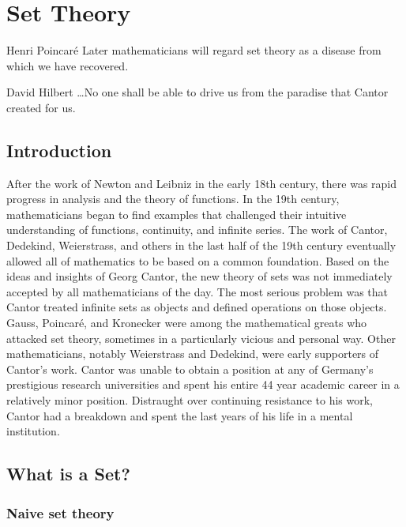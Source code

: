 \chapter{Set Theory}

\begin{chapqt}{Henri Poincar\'e}
Later mathematicians will regard set theory as a disease from which we have recovered.
\end{chapqt}

\begin{chapqt}{David Hilbert}
\ldots No one shall be able to drive us from the paradise that Cantor created for us.
\end{chapqt}

\section*{Introduction}

After the work of Newton and Leibniz in the early 18th century, there was rapid progress in analysis and the theory of functions. In the 19th century, mathematicians began to find examples that challenged their intuitive understanding of functions, continuity, and infinite series. The work of Cantor, Dedekind, Weierstrass, and others in the last half of the 19th century eventually allowed all of mathematics to be based on a common foundation.  Based on the ideas and insights of Georg Cantor, the new theory of sets was not immediately accepted by all mathematicians of the day.  The most serious problem was that Cantor treated infinite sets as objects and defined operations on those objects.  Gauss, Poincar\'e,  and Kronecker were among the mathematical greats who attacked set theory, sometimes in a particularly vicious and personal way. Other mathematicians, notably Weierstrass and Dedekind, were early supporters of Cantor's work. Cantor was unable to obtain a position at any of Germany's prestigious research universities and spent his entire 44 year academic career in a relatively minor position. Distraught over continuing resistance to his work, Cantor had a breakdown and spent the last years of his life in a mental institution.

\section{What is a Set?}

\subsection{Naive set theory}

